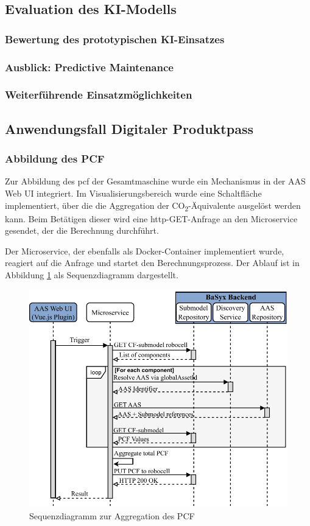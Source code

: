 \subsection{Evaluation des KI-Modells}
\subsubsection{Bewertung des prototypischen KI-Einsatzes}
\subsubsection{Ausblick: Predictive Maintenance}
\subsubsection{Weiterführende Einsatzmöglichkeiten}

\newpage
\subsection{Anwendungsfall Digitaler Produktpass}
\subsubsection{Abbildung des PCF}
Zur Abbildung des \acs{pcf} der Gesamtmaschine wurde ein Mechanismus in der AAS Web UI integriert. 
Im Visualisierungsbereich wurde eine Schaltfläche implementiert, über die die Aggregation der CO\textsubscript{2}-Äquivalente ausgelöst werden kann. 
Beim Betätigen dieser wird eine \acs{http}-GET-Anfrage an den Microservice gesendet, der die Berechnung durchführt.

Der Microservice, der ebenfalls als Docker-Container implementiert wurde, reagiert auf die Anfrage und startet den Berechnungsprozess. 
Der Ablauf ist in Abbildung \ref{fig:SequenzdiagrammPCF} als Sequenzdiagramm dargestellt.

\begin{figure}[htbp]
    \centering
        \includegraphics[width=1\textwidth]{Bilder/Ergebnisse/DPP/AggregationNue.pdf}
    \caption{Sequenzdiagramm zur Aggregation des PCF}
    \label{fig:SequenzdiagrammPCF}
\end{figure}


